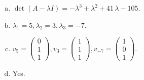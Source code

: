 \begin{questions}
\begin{solution}
\begin{enumerate}[(a)]
\item $\det(A-\lambda I)=-{\lambda}^{3} + {\lambda}^{2} + 41 \, {\lambda} - 105$.
\item ${\lambda}_1=5, {\lambda}_2=3, {\lambda}_3=-7$.
\item $v_{5}=\left(\begin{array}{r}
0 \\
1 \\
1
\end{array}\right), v_{3}=\left(\begin{array}{r}
1 \\
1 \\
1
\end{array}\right), v_{-7}=\left(\begin{array}{r}
1 \\
0 \\
1
\end{array}\right)$.
\item Yes.
\end{enumerate}
\end{solution}

\end{questions}

\newpage


